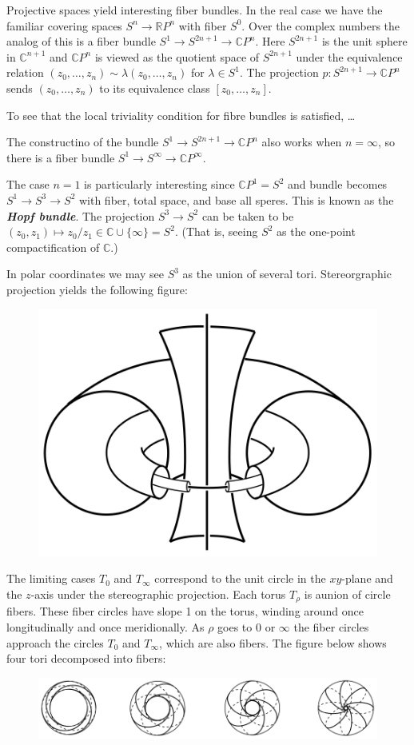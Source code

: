 \begin{example}
	Projective spaces yield interesting fiber bundles. In the real case we have the familiar covering spaces $S^n\to\mathbb{R} P^n$ with fiber $S^0$. Over the complex numbers the analog of this is a fiber bundle $S^1\to S^{2n+1}\to\mathbb{C} P^n$. Here $S^{2n+1}$ is the unit sphere in $\mathbb{C}^{n+1}$ and $\mathbb{C} P^n$ is viewed as the quotient space of $S^{2n+1}$ under the equivalence relation $(z_0,\ldots,z_n)\sim\lambda(z_0,\ldots,z_n)$ {\color{orange}for $\lambda\in S^1$}. The projection $p:S^{2n+1}\to\mathbb{C} P^n$ sends $(z_0,\ldots,z_n)$ to its equivalence class $[z_0,\ldots,z_n]$.
	
	To see that the local triviality condition for fibre bundles is satisfied, …
	
	The constructino of the bundle $S^1\to S^{2n+1}\to\mathbb{C} P^n$ also works when $n=\infty$, so there is a fiber bundle $S^1\to S^\infty\to \mathbb{C} P^\infty$.
	
	The case $n=1$ is particularly interesting since $\mathbb{C} P^1=S^2$ and bundle becomes $S^1\to S^3\to S^2$ with fiber, total space, and base all speres. This is known as the \textbf{\textit{Hopf bundle}}. The projection $S^3\to S^2$ can be taken to be $(z_0,z_1)\mapsto z_0/z_1\in\mathbb{C}\cup\{\infty\}=S^2$. {\color{persiangreen}(That is, seeing $S^2$ as the one-point compactification of $\mathbb{C}$.)}
	
	In polar coordinates we may see $S^3$ as the union of several tori. Stereorgraphic projection yields the following figure:
	\begin{figure}[H]
		\centering
		\includegraphics[width=0.5\linewidth]{hopf-bundle}
		\label{fig:hopf-bundle}
	\end{figure}
	The limiting cases $T_0$ and $T_\infty$ correspond to the unit circle in the $xy$-plane and the $z$-axis under the stereographic projection.	Each torus $T_\rho$ is aunion of circle fibers. These fiber circles have slope 1 on the torus, winding around once longitudinally and once meridionally. As $\rho$ goes to $0$ or $\infty$ the fiber circles approach the circles $T_0$ and $T_\infty$, which are also fibers. The figure below shows four tori decomposed into fibers:
	\begin{figure}[H]
		\centering
		\includegraphics[width=0.9\linewidth]{hopf-bundle2}
		\label{fig:hopf-bundle2}
	\end{figure}
	

\end{example}
